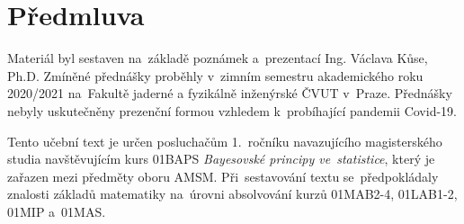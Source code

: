 \chapter*{Předmluva}

Materiál byl sestaven na~základě poznámek a~prezentací Ing. Václava Kůse, Ph.D. Zmíněné přednášky proběhly v~zimním semestru akademického roku 2020/2021 na~Fakultě jaderné a
fyzikálně inženýrské ČVUT v~Praze. Přednášky nebyly uskutečněny prezenční formou vzhledem k~probíhající pandemii Covid-19. 

Tento učební text je určen posluchačům 1.~ročníku navazujícího magisterského studia navštěvujícím kurs 01BAPS\emph{ Bayesovské principy ve~statistice}, který je zařazen
mezi předměty oboru AMSM. Při~sestavování textu se~předpokládaly znalosti základů matematiky na~úrovni absolvování kurzů 01MAB2-4, 01LAB1-2, 01MIP a~01MAS.
